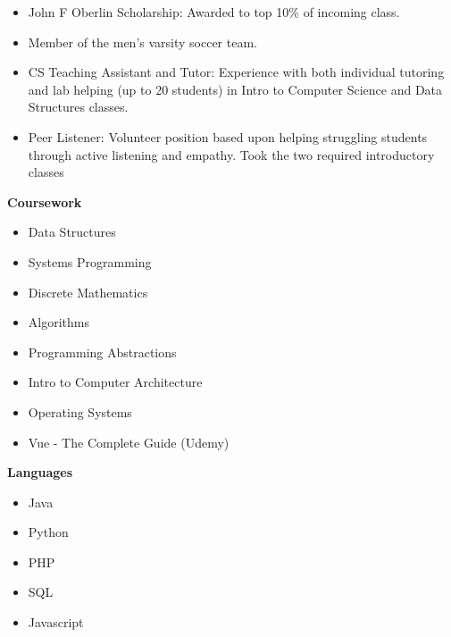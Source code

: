 \begin{itemize}
    \item John F Oberlin Scholarship: Awarded to top 10\% of incoming class.
    \item Member of the men's varsity soccer team.
    \item CS Teaching Assistant and Tutor: Experience with both individual tutoring and lab helping (up to 20 students) in Intro to Computer Science and Data Structures classes.
    \item Peer Listener: Volunteer position based upon helping struggling students through active listening and empathy. Took the two required introductory classes
\end{itemize}
\textbf{Coursework}
\vspace*{-10px}
\begin{multicols*}{2}
\begin{itemize}
    \item Data Structures
    \item Systems Programming
    \item Discrete Mathematics
    \item Algorithms 
    \item Programming Abstractions
    \item Intro to Computer Architecture
    \item Operating Systems
    \item Vue - The Complete Guide (Udemy)
    
\end{itemize}
\end{multicols*}
\textbf{Languages}
\vspace*{-10px}
\begin{multicols}{2}
\begin{itemize}
    \item Java
    \item Python
    \item PHP
    \item SQL
    \item Javascript
\end{itemize}
\end{multicols}

